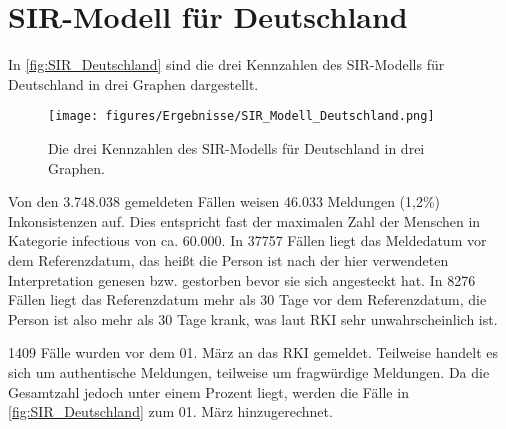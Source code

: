 \section{SIR-Modell für Deutschland}\label{sec:Resultate-SIR}
In \autoref{fig:SIR_Deutschland} sind die drei Kennzahlen des SIR-Modells für Deutschland in drei Graphen dargestellt.
\begin{figure}[H]
    \centering
    \texttt{[image: figures/Ergebnisse/SIR\_Modell\_Deutschland.png]}
    \caption{Die drei Kennzahlen des SIR-Modells für Deutschland in drei Graphen.}
    \label{fig:SIR_Deutschland}
\end{figure}

Von den 3.748.038 gemeldeten Fällen weisen 46.033 Meldungen (1,2\%) Inkonsistenzen auf. Dies entspricht fast der maximalen Zahl der Menschen in Kategorie \glqq{}infectious\grqq{} von ca. 60.000.
In 37757 Fällen liegt das Meldedatum vor dem Referenzdatum, das heißt die Person ist nach der hier verwendeten Interpretation genesen bzw. gestorben bevor sie sich angesteckt hat. In 8276 Fällen liegt das Referenzdatum mehr als 30 Tage vor dem Referenzdatum, die Person ist also mehr als 30 Tage krank, was laut RKI sehr unwahrscheinlich ist.\autocite{RKI_Bulletin}

1409 Fälle wurden vor dem 01. März an das RKI gemeldet. Teilweise handelt es sich um authentische Meldungen, teilweise um fragwürdige Meldungen. Da die Gesamtzahl jedoch unter einem Prozent liegt, werden die Fälle in \autoref{fig:SIR_Deutschland} zum 01. März hinzugerechnet.